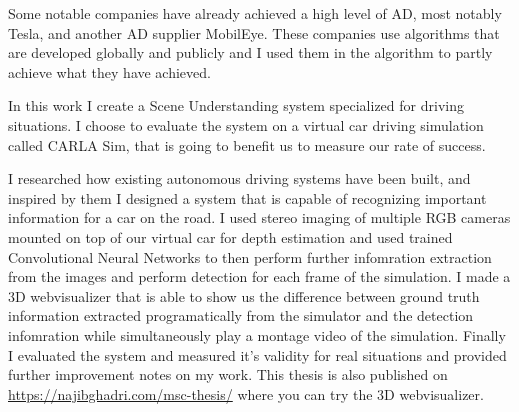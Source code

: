 Some notable companies have already achieved a high level of AD, most notably
Tesla, and another AD supplier MobilEye. These companies use algorithms that are
developed globally and publicly and I used them in the algorithm to partly achieve
what they have achieved. 

In this work I create a Scene Understanding system specialized for driving
situations. I choose to evaluate the system on a virtual car driving simulation
called CARLA Sim, that is going to benefit us to measure our rate of success.

I researched how existing autonomous driving systems have been built, and
inspired by them I designed a system that is capable of recognizing important
information for a car on the road. I used stereo imaging of multiple RGB cameras
mounted on top of our virtual car for depth estimation and used trained
Convolutional Neural Networks to then perform further infomration extraction
from the images and perform detection for each frame of the simulation. I made a
3D webvisualizer that is able to show us the difference between ground truth
information extracted programatically from the simulator and the detection
infomration while simultaneously play a montage video of the simulation. Finally
I evaluated the system and measured it's validity for real situations and
provided further improvement notes on my work. This thesis is also published on
\url{https://najibghadri.com/msc-thesis/} where you can try the 3D
webvisualizer.

\vfill
\selectthesislanguage

\setcounter{romanPage}{\value{page}}
